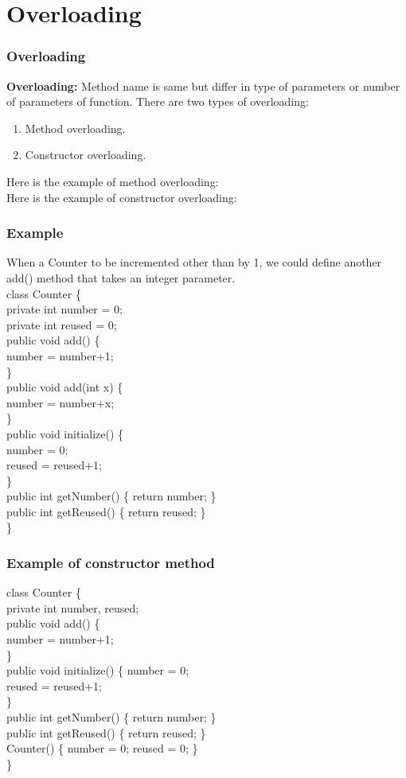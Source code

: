 \documentclass{beamer}
\begin{document}
\section{Overloading}
\begin{frame}
    \frametitle{Overloading}
    \textbf{Overloading:} Method name is same but differ in type of parameters or number of parameters of function.
    There are two types of overloading:
    \begin{enumerate}
        \item Method overloading.
        \item Constructor overloading.
    \end{enumerate}
    Here is the example of method overloading: \href{method_overload.java}{\color{green}{Method overloading}} \\
    Here is the example of constructor overloading: \href{constructor_overload.java}{\color{green}{Constructor loading}}
\end{frame}
\begin{frame}
\frametitle{Example}
When a Counter to be incremented other than by 1, we could define another add() method that takes an integer parameter.\\ class Counter \{\\
private int number = 0;\\
private int reused = 0;\\
public void add() \{\\
number = number+1;\\
\}\\
public void add(int x) \{\\
number = number+x;\\
\}\\
public void initialize() \{\\
number = 0;\\
reused = reused+1;\\
\}\\
public int getNumber() \{ return number; \} \\
public int getReused() \{ return reused; \}\\
\}\\
\end{frame}
\begin{frame}
\frametitle{Example of constructor method}
class Counter \{\\
private int number, reused;\\
public void add() \{\\
number = number+1;\\
\}\\
public void initialize() \{
number = 0;\\
reused = reused+1;\\
\}\\
public int getNumber() \{ return number; \}\\
public int getReused() \{ return reused; \}\\
Counter() \{ number = 0; reused = 0; \}\\
\}\\
\end{frame}
\end{document}
